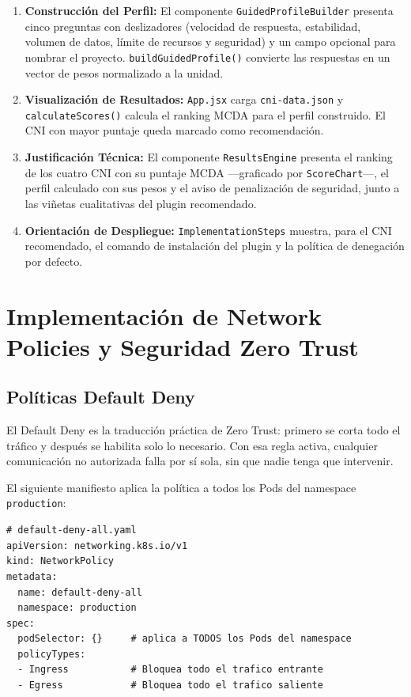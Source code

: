 \begin{enumerate}
\item \textbf{Construcción del Perfil:} El componente \texttt{GuidedProfileBuilder} presenta cinco preguntas con deslizadores (velocidad de respuesta, estabilidad, volumen de datos, límite de recursos y seguridad) y un campo opcional para nombrar el proyecto. \texttt{buildGuidedProfile()} convierte las respuestas en un vector de pesos normalizado a la unidad.
\item \textbf{Visualización de Resultados:} \texttt{App.jsx} carga \texttt{cni-data.json} y \texttt{calculateScores()} calcula el ranking MCDA para el perfil construido. El CNI con mayor puntaje queda marcado como recomendación.
\item \textbf{Justificación Técnica:} El componente \texttt{ResultsEngine} presenta el ranking de los cuatro CNI con su puntaje MCDA ---graficado por \texttt{ScoreChart}---, el perfil calculado con sus pesos y el aviso de penalización de seguridad, junto a las viñetas cualitativas del plugin recomendado.
\item \textbf{Orientación de Despliegue:} \texttt{ImplementationSteps} muestra, para el CNI recomendado, el comando de instalación del plugin y la política de denegación por defecto.
\end{enumerate}

\section{Implementación de Network Policies y Seguridad Zero Trust}

\subsection{Políticas Default Deny}

El Default Deny es la traducción práctica de Zero Trust: primero se corta todo el tráfico y después se habilita solo lo necesario. Con esa regla activa, cualquier comunicación no autorizada falla por sí sola, sin que nadie tenga que intervenir.

El siguiente manifiesto aplica la política a todos los Pods del namespace \texttt{production}:

\begin{lstlisting}
# default-deny-all.yaml
apiVersion: networking.k8s.io/v1
kind: NetworkPolicy
metadata:
  name: default-deny-all
  namespace: production
spec:
  podSelector: {}     # aplica a TODOS los Pods del namespace
  policyTypes:
  - Ingress           # Bloquea todo el trafico entrante
  - Egress            # Bloquea todo el trafico saliente
\end{lstlisting}

